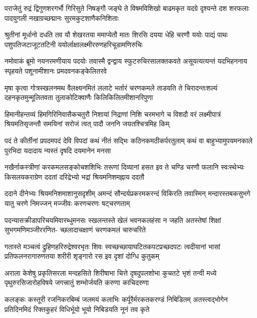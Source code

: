 \fourlineindentedshloka
{पराजेतुं रुद्रं द्विगुणशरगर्भौ गिरिसुते}
{निषङ्गौ जङ्घे ते विषमविशिखो बाढमकृत}
{यदग्रे दृश्यन्ते दश शरफलाः पादयुगली}
{नखाग्रच्छद्मानः सुरमकुटशाणैकनिशिताः}%

\fourlineindentedshloka
{श्रुतीनां मूर्धानो दधति तव यौ शेखरतया}
{ममाप्येतौ मातः शिरसि दयया धेहि चरणौ}
{ययोः पाद्यं पाथः पशुपतिजटाजूटतटिनी}
{ययोर्लाक्षालक्ष्मीररुणहरिचूडामणिरुचिः}%

\fourlineindentedshloka
{नमोवाकं ब्रूमो नयनरमणीयाय पदयोः}
{तवास्मै द्वन्द्वाय स्फुटरुचिरसालक्तकवते}
{असूयत्यत्यन्तं यदभिहननाय स्पृहयते}
{पशूनामीशानः प्रमदवनकङ्केलितरवे}%

\fourlineindentedshloka
{मृषा कृत्वा गोत्रस्खलनमथ वैलक्ष्यनमितं}
{ललाटे भर्तारं चरणकमले ताडयति ते}
{चिरादन्तःशल्यं दहनकृतमुन्मूलितवता}
{तुलाकोटिक्वाणैः किलिकिलितमीशानरिपुणा}%

\fourlineindentedshloka
{हिमानीहन्तव्यं हिमगिरिनिवासैकचतुरौ}
{निशायां निद्राणां निशि चरमभागे च विशदौ}
{वरं लक्ष्मीपात्रं श्रियमतिसृजन्तौ समयिनां}
{सरोजं त्वत् पादौ जननि जयतश्चित्रमिह किम्}%

\fourlineindentedshloka
{पदं ते कीर्तीनां प्रपदमपदं देवि विपदां}
{कथं नीतं सद्भिः कठिनकमठीकर्परतुलाम्}
{कथं वा बाहुभ्यामुपयमनकाले पुरभिदा}
{यदादाय न्यस्तं दृषदि दयमानेन मनसा}%

\fourlineindentedshloka
{नखैर्नाकस्त्रीणां करकमलसङ्कोचशशिभिः}
{तरूणां दिव्यानां हसत इव ते चण्डि चरणौ}
{फलानि स्वःस्थेभ्यः किसलयकराग्रेण ददतां}
{दरिद्रेभ्यो भद्रां श्रियमनिशमह्नाय ददतौ}%

\fourlineindentedshloka
{ददाने दीनेभ्यः श्रियमनिशमाशानुसदृशीम्}
{अमन्दं सौन्दर्यप्रकरमकरन्दं विकिरति}
{तवास्मिन् मन्दारस्तबकसुभगे यातु चरणे}
{निमज्जन् मज्जीवः करणचरणः षट्चरणताम्}%

\fourlineindentedshloka
{पदन्यासक्रीडापरिचयमिवारब्धुमनसः}
{स्खलन्तस्ते खेलं भवनकलहंसा न जहति}
{अतस्तेषां शिक्षां सुभगमणिमञ्जीररणित-}
{च्छलादाचक्षाणं चरणकमलं चारुचरिते}%

\fourlineindentedshloka
{गतास्ते मञ्चत्वं द्रुहिणहरिरुद्रेश्वरभृतः}
{शिवः स्वच्छच्छायाघटितकपटप्रच्छदपटः}
{त्वदीयानां भासां प्रतिफलनरागारुणतया}
{शरीरी शृङ्गारो रस इव दृशां दोग्धि कुतुकम्}%

\fourlineindentedshloka
{अराला केशेषु प्रकृतिसरला मन्दहसिते}
{शिरीषाभा चित्ते दृषदुपलशोभा कुचतटे}
{भृशं तन्वी मध्ये पृथुरुरसिजारोहविषये}
{जगत्त्रातुं शम्भोर्जयति करुणा काचिदरुणा}%

\fourlineindentedshloka
{कलङ्कः कस्तूरी रजनिकरबिम्बं जलमयं}
{कलाभिः कर्पूरैर्मरकतकरण्डं निबिडितम्}
{अतस्त्वद्भोगेन प्रतिदिनमिदं रिक्तकुहरं}
{विधिर्भूयो भूयो निबिडयति नूनं तव कृते}%

